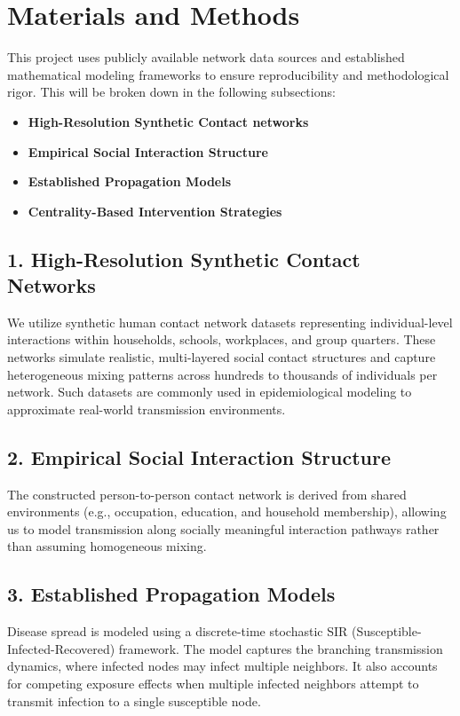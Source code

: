 \documentclass[9pt,twocolumn]{pnas-new}
\begin{document}
\section*{Materials and Methods}
This project uses publicly available network data sources and established mathematical modeling frameworks to ensure reproducibility and methodological rigor. This will be broken down in the following subsections: 

\begin{itemize}
    \item \textbf{High-Resolution Synthetic Contact networks} 
    \item \textbf{Empirical Social Interaction Structure} 
    \item \textbf{Established Propagation Models} 
    \item \textbf{Centrality-Based Intervention Strategies} 
\end{itemize}

\subsection*{1. High-Resolution Synthetic Contact Networks}
We utilize synthetic human contact network datasets representing individual-level interactions within households, schools, workplaces, and group quarters. These networks simulate realistic, multi-layered social contact structures and capture heterogeneous mixing patterns across hundreds to thousands of individuals per network. Such datasets are commonly used in epidemiological modeling to approximate real-world transmission environments.

\subsection*{2. Empirical Social Interaction Structure}
The constructed person-to-person contact network is derived from shared environments (e.g., occupation, education, and household membership), allowing us to model transmission along socially meaningful interaction pathways rather than assuming homogeneous mixing.

\subsection*{3. Established Propagation Models}
Disease spread is modeled using a discrete-time stochastic SIR (Susceptible-Infected-Recovered) framework. The model captures the branching transmission dynamics, where infected nodes may infect multiple neighbors. It also accounts for competing exposure effects when multiple infected neighbors attempt to transmit infection to a single susceptible node.
\end{document}
